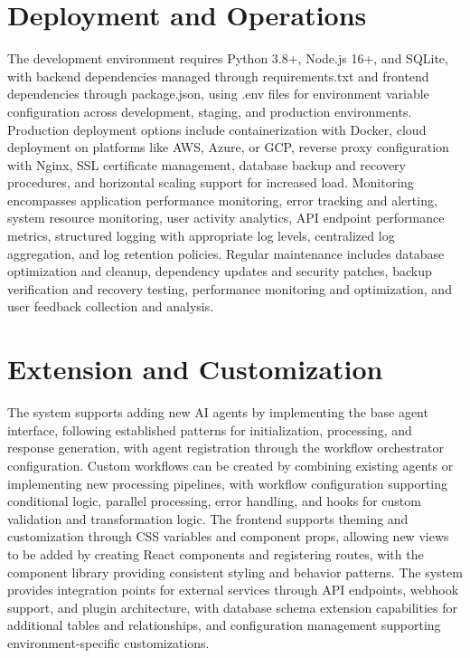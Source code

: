 \documentclass{article}
\begin{document}
\section{Deployment and Operations}
The development environment requires Python 3.8+, Node.js 16+, and SQLite, with backend dependencies managed through requirements.txt and frontend dependencies through package.json, using .env files for environment variable configuration across development, staging, and production environments. Production deployment options include containerization with Docker, cloud deployment on platforms like AWS, Azure, or GCP, reverse proxy configuration with Nginx, SSL certificate management, database backup and recovery procedures, and horizontal scaling support for increased load. Monitoring encompasses application performance monitoring, error tracking and alerting, system resource monitoring, user activity analytics, API endpoint performance metrics, structured logging with appropriate log levels, centralized log aggregation, and log retention policies. Regular maintenance includes database optimization and cleanup, dependency updates and security patches, backup verification and recovery testing, performance monitoring and optimization, and user feedback collection and analysis.

\section{Extension and Customization}
The system supports adding new AI agents by implementing the base agent interface, following established patterns for initialization, processing, and response generation, with agent registration through the workflow orchestrator configuration. Custom workflows can be created by combining existing agents or implementing new processing pipelines, with workflow configuration supporting conditional logic, parallel processing, error handling, and hooks for custom validation and transformation logic. The frontend supports theming and customization through CSS variables and component props, allowing new views to be added by creating React components and registering routes, with the component library providing consistent styling and behavior patterns. The system provides integration points for external services through API endpoints, webhook support, and plugin architecture, with database schema extension capabilities for additional tables and relationships, and configuration management supporting environment-specific customizations.
\end{document}
